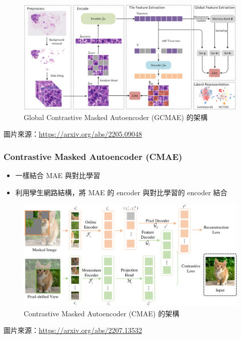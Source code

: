 \documentclass[xcolor=dvipsnames]{beamer}
\begin{document}
    \begin{frame}
        \begin{figure}
            \centering
            \includegraphics[width=1\textwidth]{src/GCMAE.png}
            \caption{Global Contrastive Masked Autoencoder (GCMAE) 的架構}
            \label{fig:gcmae_architecture}
        \end{figure}
        圖片來源：\url{https://arxiv.org/abs/2205.09048}
    \end{frame}

    \begin{frame}
        \frametitle{Contrastive Masked Autoencoder (CMAE)}
        \begin{itemize}
            \item 一樣結合 MAE 與對比學習
            \item 利用孿生網路結構，將 MAE 的 encoder 與對比學習的 encoder 結合
        \end{itemize}
    \end{frame}

    \begin{frame}
        \begin{figure}
            \centering
            \includegraphics[width=1\textwidth]{src/CMAE.png}
            \caption{Contrastive Masked Autoencoder (CMAE) 的架構}
            \label{fig:cmae_architecture}
        \end{figure}
        圖片來源：\url{https://arxiv.org/abs/2207.13532}
    \end{frame}
\end{document}
